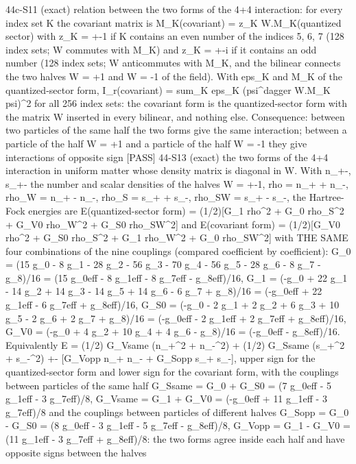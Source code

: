 \documentclass[
  10pt,
]{article}
\newenvironment{Shaded}{}{}
\newcommand{\NormalTok}[1]{#1}
\begin{document}
\begin{Shaded}
\begin{Highlighting}[]
\NormalTok{[PASS] 44c{-}S11  (exact) relation between the two forms of the 4+4 interaction: for every index set K the covariant matrix is M\_K(covariant) = z\_K W.M\_K(quantized sector) with z\_K = +{-}1 if K contains an even number of the indices 5, 6, 7 (128 index sets; W commutes with M\_K) and z\_K = +{-}i if it contains an odd number (128 index sets; W anticommutes with M\_K, and the bilinear connects the two halves W = +1 and W = {-}1 of the field). With eps\_K and M\_K of the quantized{-}sector form, I\_r(covariant) = sum\_K eps\_K (psi\^{}dagger W.M\_K psi)\^{}2 for all 256 index sets: the covariant form is the quantized{-}sector form with the matrix W inserted in every bilinear, and nothing else. Consequence: between two particles of the same half the two forms give the same interaction; between a particle of the half W = +1 and a particle of the half W = {-}1 they give interactions of opposite sign}
\NormalTok{[PASS] 44{-}S13  (exact) the two forms of the 4+4 interaction in uniform matter whose density matrix is diagonal in W. With n\_+{-}, s\_+{-} the number and scalar densities of the halves W = +{-}1, rho = n\_+ + n\_{-}, rho\_W = n\_+ {-} n\_{-}, rho\_S = s\_+ + s\_{-}, rho\_SW = s\_+ {-} s\_{-}, the Hartree{-}Fock energies are E(quantized{-}sector form) = (1/2)[G\_1 rho\^{}2 + G\_0 rho\_S\^{}2 + G\_V0 rho\_W\^{}2 + G\_S0 rho\_SW\^{}2] and E(covariant form) = (1/2)[G\_V0 rho\^{}2 + G\_S0 rho\_S\^{}2 + G\_1 rho\_W\^{}2 + G\_0 rho\_SW\^{}2] with THE SAME four combinations of the nine couplings (compared coefficient by coefficient): G\_0 = (15 g\_0 {-} 8 g\_1 {-} 28 g\_2 {-} 56 g\_3 {-} 70 g\_4 {-} 56 g\_5 {-} 28 g\_6 {-} 8 g\_7 {-} g\_8)/16 = (15 g\_0eff {-} 8 g\_1eff {-} 8 g\_7eff {-} g\_8eff)/16, G\_1 = ({-}g\_0 + 22 g\_1 {-} 14 g\_2 + 14 g\_3 {-} 14 g\_5 + 14 g\_6 {-} 6 g\_7 + g\_8)/16 = ({-}g\_0eff + 22 g\_1eff {-} 6 g\_7eff + g\_8eff)/16, G\_S0 = ({-}g\_0 {-} 2 g\_1 + 2 g\_2 + 6 g\_3 + 10 g\_5 {-} 2 g\_6 + 2 g\_7 + g\_8)/16 = ({-}g\_0eff {-} 2 g\_1eff + 2 g\_7eff + g\_8eff)/16, G\_V0 = ({-}g\_0 + 4 g\_2 + 10 g\_4 + 4 g\_6 {-} g\_8)/16 = ({-}g\_0eff {-} g\_8eff)/16. Equivalently E = (1/2) G\_Vsame (n\_+\^{}2 + n\_{-}\^{}2) + (1/2) G\_Ssame (s\_+\^{}2 + s\_{-}\^{}2) +{-} [G\_Vopp n\_+ n\_{-} + G\_Sopp s\_+ s\_{-}], upper sign for the quantized{-}sector form and lower sign for the covariant form, with the couplings between particles of the same half G\_Ssame = G\_0 + G\_S0 = (7 g\_0eff {-} 5 g\_1eff {-} 3 g\_7eff)/8, G\_Vsame = G\_1 + G\_V0 = ({-}g\_0eff + 11 g\_1eff {-} 3 g\_7eff)/8 and the couplings between particles of different halves G\_Sopp = G\_0 {-} G\_S0 = (8 g\_0eff {-} 3 g\_1eff {-} 5 g\_7eff {-} g\_8eff)/8, G\_Vopp = G\_1 {-} G\_V0 = (11 g\_1eff {-} 3 g\_7eff + g\_8eff)/8: the two forms agree inside each half and have opposite signs between the halves}

\end{Highlighting}
\end{Shaded}
\end{document}
